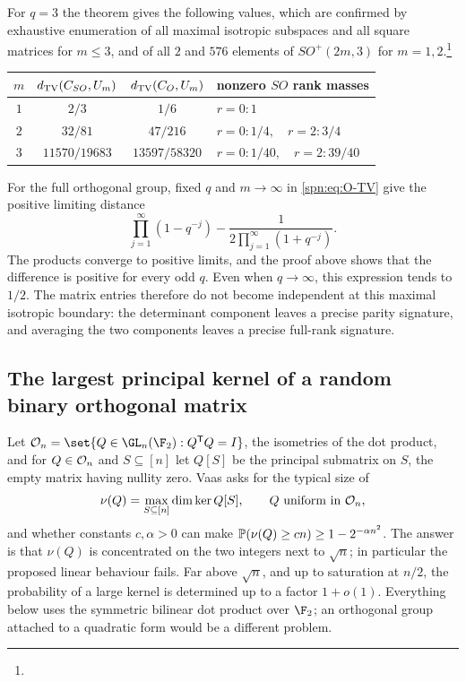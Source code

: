 \begin{example}\label{spn:ex:orthogonal-q3}
For $q=3$ the theorem gives the following values, which are confirmed by
exhaustive enumeration of all maximal isotropic subspaces and all square
matrices for $m\le3$, and of all $2$ and $576$ elements of $SO^+(2m,3)$ for
$m=1,2$.\footnote{}
\begin{center}
\begin{tabular}{c|c|c|l}
 $m$ & $d_{\mathrm{TV}}(C_{SO},U_m)$ & $d_{\mathrm{TV}}(C_{O},U_m)$ & nonzero $SO$ rank masses\\\hline
 $1$ & $2/3$ & $1/6$ & $r=0\colon 1$\\
 $2$ & $32/81$ & $47/216$ & $r=0\colon 1/4,\quad r=2\colon 3/4$\\
 $3$ & $11570/19683$ & $13597/58320$ & $r=0\colon 1/40,\quad r=2\colon 39/40$
\end{tabular}
\end{center}
\end{example}

For the full orthogonal group, fixed $q$ and $m\to\infty$ in
\eqref{spn:eq:O-TV} give the positive limiting distance
\[
 \prod_{j=1}^{\infty}(1-q^{-j})-\frac{1}{2\prod_{j=1}^{\infty}(1+q^{-j})} .
\]
The products converge to positive limits, and the proof above shows that the
difference is positive for every odd $q$. Even when $q\to\infty$, this
expression tends to $1/2$. The matrix entries therefore do not become
independent at this maximal isotropic boundary: the determinant component
leaves a precise parity signature, and averaging the two components leaves a
precise full-rank signature.

\subsection{The largest principal kernel of a random binary orthogonal matrix}\label{spn:sec:binary}

Let $\spnOrth_n=\set{Q\in\GL_n(\F_2):Q^{\spnT}Q=I}$, the isometries of the dot product, and
for $Q\in\mathcal{O}_n$ and $S\subseteq[n]$ let $Q[S]$ be the principal submatrix on $S$, the empty
matrix having nullity zero. Vaas \cite{Vaas2026Principal} asks for the typical size of
\[
 \nu(Q)=\max_{S\subseteq[n]}\dim\ker Q[S],\qquad
 Q\text{ uniform in }\mathcal{O}_n ,
\]
and whether constants $c,\alpha>0$ can make
$\mathbb{P}(\nu(Q)\ge cn)\ge1-2^{-\alpha n^2}$. The answer is that $\nu(Q)$ is concentrated on the
two integers next to $\sqrt n$; in particular the proposed linear behaviour fails. Far above
$\sqrt n$, and up to saturation at $n/2$, the probability of a large kernel is determined up to a
factor $1+o(1)$. Everything
below uses the symmetric bilinear dot product over $\F_2$; an orthogonal group attached to a
quadratic form would be a different problem.

